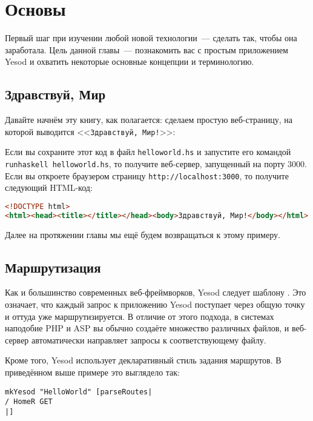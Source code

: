 \chapter{Основы}\label{chap:basics}

Первый шаг при изучении любой новой технологии~--- сделать так, чтобы она заработала. Цель
данной главы~--- познакомить вас с простым приложением Yesod и охватить некоторые основные
концепции и терминологию.

\section{Здравствуй, Мир}

Давайте начнём эту книгу, как полагается: сделаем простую веб-страницу, на которой
выводится <<\texttt{Здравствуй, Мир!}>>:

Если вы сохраните этот код в файл \lstinline!helloworld.hs! и запустите его командой
\lstinline!runhaskell helloworld.hs!, то получите веб-сервер, запущенный на порту 3000.
Если вы откроете браузером страницу \lstinline'http://localhost:3000', то получите
следующий HTML-код:

\begin{lstlisting}[language=HTML]
<!DOCTYPE html>
<html><head><title></title></head><body>Здравствуй, Мир!</body></html>
\end{lstlisting}

Далее на протяжении главы мы ещё будем возвращаться к этому примеру.

\section{Маршрутизация}

Как и большинство современных веб-фреймворков, Yesod следует шаблону
.
Это означает, что каждый запрос к приложению Yesod поступает через общую точку и
оттуда уже маршрутизируется. В отличие от этого подхода, в системах наподобие PHP и ASP вы
обычно создаёте множество различных файлов, и веб-сервер автоматически направляет запросы
к соответствующему файлу.

Кроме того, Yesod использует декларативный стиль задания маршрутов. В приведённом выше
примере это выглядело так:

\begin{lstlisting}
mkYesod "HelloWorld" [parseRoutes|
/ HomeR GET
|]
\end{lstlisting}

